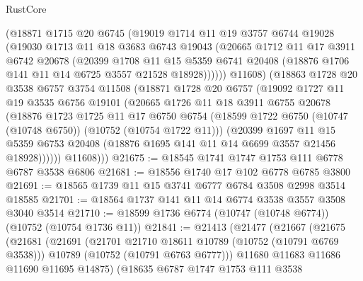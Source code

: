 \begin{lexlean}{RustCore}
\begin{coremodule}
          (@18871
            @1715
            @20
            @6745
            (@19019
              @1714
              @11
              @19
              @3757
              @6744
              @19028
              (@19030
                @1713
                @11
                @18
                @3683
                @6743
                @19043
                (@20665
                  @1712
                  @11
                  @17
                  @3911
                  @6742
                  @20678
                  (@20399
                    @1708
                    @11
                    @15
                    @5359
                    @6741
                    @20408
                    (@18876 @1706 @141 @11 @14 @6725 @3557 @21528 @18928))))))
          @11608)
        (@18863
          @1728
          @20
          @3538
          @6757
          @3754
          @11508
          (@18871
            @1728
            @20
            @6757
            (@19092
              @1727
              @11
              @19
              @3535
              @6756
              @19101
              (@20665
                @1726
                @11
                @18
                @3911
                @6755
                @20678
                (@18876
                  @1723
                  @1725
                  @11
                  @17
                  @6750
                  @6754
                  (@18599 @1722 @6750 (@10747 (@10748 @6750)) (@10752 (@10754 @1722 @11)))
                  (@20399
                    @1697
                    @11
                    @15
                    @5359
                    @6753
                    @20408
                    (@18876 @1695 @141 @11 @14 @6699 @3557 @21456 @18928))))))
          @11608)))
@21675 := @18545 @1741 @1747 @1753 @111 @6778 @6787 @3538 @6806
@21681 := @18556 @1740 @17 @102 @6778 @6785 @3800
@21691 := @18565 @1739 @11 @15 @3741 @6777 @6784 @3508 @2998 @3514 @18585
@21701 := @18564 @1737 @141 @11 @14 @6774 @3538 @3557 @3508 @3040 @3514
@21710 := @18599 @1736 @6774 (@10747 (@10748 @6774)) (@10752 (@10754 @1736 @11))
@21841 := @21413
    (@21477
      (@21667
        (@21675
          (@21681
            (@21691
              (@21701 @21710 @18611 @10789 (@10752 (@10791 @6769 @3538)))
              @10789
              (@10752 (@10791 @6763 @6777)))
            @11680
            @11683
            @11686
            @11690
            @11695
            @14875)
          (@18635
            @6787
            @1747
            @1753
            @111
            @3538

\end{coremodule}
\end{lexlean}

